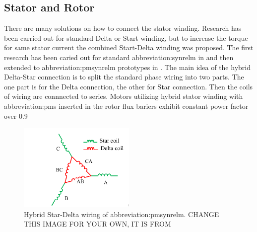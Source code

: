 \documentclass[a4paper, twoside, 11pt]{article}
\begin{document}
    \subsection{Stator and Rotor}
        There are many solutions on how to connect the stator winding. Research has been carried out for standard Delta or Start winding, but to increase the torque for same stator current the combined Start-Delta winding was proposed. The first research has been caried out for standard \gls{abbreviation:synrelm} in \cite{ibrahim-an-improved-torque-density-synchronous-reluctance-machine-with-a-combined-star-delta-winding-layout} and then extended to \gls{abbreviation:pmsynrelm} prototypes in \cite{ibrahim-permanent-magnet-assisted-synchronous-reluctance-motor-employing-a-hybrid-star-delta-winding-for-high-speed-applicaitons}. The main idea of the hybrid Delta-Star connection is to split the standard phase wiring into two parts. The one part is for the Delta connection, the other for Star connection. Then the coils of wiring are connnected to series. Motors utilizing hybrid stator winding with \gls{abbreviation:pm}s inserted in the rotor flux bariers exhibit constant power factor over 0.9

        \begin{figure}[htbp!]
            \centering
            \includegraphics[width=0.5\textwidth]{src/png/hybrid-star-delta-wiring.png}
            \caption{Hybrid Star-Delta wiring of \gls{abbreviation:pmsynrelm}. {\textcolor{ctured}{CHANGE THIS IMAGE FOR YOUR OWN, IT IS FROM \cite{ibrahim-permanent-magnet-assisted-synchronous-reluctance-motor-employing-a-hybrid-star-delta-winding-for-high-speed-applicaitons}}}}
            \label{fig:hybrid-star-delta-wiring}
        \end{figure}
\end{document}
